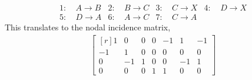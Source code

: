 \begin{enumerate}
\begin{enumerate}
\begin{align}
                        1 :\  & A \rightarrow B & 2 :\  & B \rightarrow C &
                        3 :\  & C \rightarrow X & 4 :\  & D \rightarrow X   \\
                        5 :\  & D \rightarrow A & 6 :\  & A \rightarrow C &
                        7 :\  & C \rightarrow A &
                    \end{align}
                    This translates to the nodal incidence matrix,
                    \begin{align}
                        \begin{bmatrix*}[r]
                            1  & 0  & 0 & 0 & -1 & 1  & -1 \\
                            -1 & 1  & 0 & 0 & 0  & 0  & 0  \\
                            0  & -1 & 1 & 0 & 0  & -1 & 1  \\
                            0  & 0  & 0 & 1 & 1  & 0  & 0
                        \end{bmatrix*}
                    \end{align}


\end{enumerate}
\end{enumerate}
